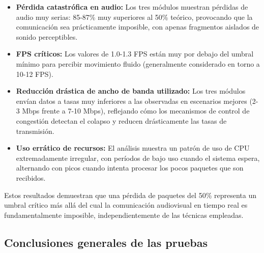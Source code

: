 \begin{itemize}
    \item \textbf{Pérdida catastrófica en audio:} Los tres módulos muestran pérdidas de audio muy serias: 85-87\% muy superiores al 50\% teórico, provocando que la comunicación sea prácticamente imposible, con apenas fragmentos aislados de sonido perceptibles.
    
    \item \textbf{FPS críticos:} Los valores de 1.0-1.3 FPS están muy por debajo del umbral mínimo para percibir movimiento fluido (generalmente considerado en torno a 10-12 FPS).
    
    \item \textbf{Reducción drástica de ancho de banda utilizado:} Los tres módulos envían datos a tasas muy inferiores a las observadas en escenarios mejores (2-3 Mbps frente a 7-10 Mbps), reflejando cómo los mecanismos de control de congestión detectan el colapso y reducen drásticamente las tasas de transmisión.
    
    \item \textbf{Uso errático de recursos:} El análisis muestra un patrón de uso de CPU extremadamente irregular, con períodos de bajo uso cuando el sistema espera, alternando con picos cuando intenta procesar los pocos paquetes que son recibidos.

\end{itemize}

Estos resultados demuestran que una pérdida de paquetes del 50\% representa un umbral crítico más allá del cual la comunicación audiovisual en tiempo real es fundamentalmente imposible, independientemente de las técnicas empleadas.

\newpage

\subsection{Conclusiones generales de las pruebas}

\setlength{\tabcolsep}{3pt} 

